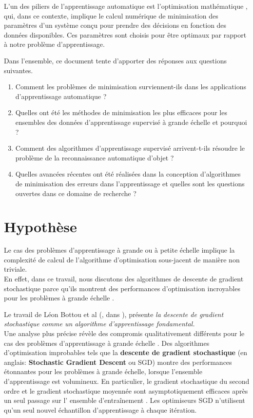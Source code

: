 		L'un des piliers de l'apprentissage automatique est l'optimisation mathématique \cite{bottou2018optimization}, qui, dans ce contexte, implique le calcul numérique de minimisation des paramètres d'un système conçu pour prendre des décisions en fonction des données disponibles. Ces paramètres sont choisis pour être optimaux par rapport à notre problème d'apprentissage.
		
		Dans l'ensemble, ce document tente d'apporter des réponses aux questions suivantes.
		\begin{enumerate}
			\item Comment les problèmes de minimisation surviennent-ils dans les applications d'apprentissage automatique ?
			\item Quelles ont été les méthodes de minimisation les plus efficaces pour les ensembles des données d'apprentissage supervisé à grande échelle et pourquoi ?
			\item Comment des algorithmes d'apprentissage supervisé arrivent-t-ils résoudre le problème de la reconnaissance automatique d'objet ?
			\item Quelles avancées récentes ont été réalisées dans la conception d'algorithmes de minimisation des erreurs dans l'apprentissage et quelles sont les questions ouvertes dans ce domaine de recherche ?
		\end{enumerate}
	
	\section{Hypothèse}
		Le cas des problèmes d'apprentissage à grande ou à petite échelle implique la complexité de calcul de l'algorithme d'optimisation sous-jacent de manière non triviale.\\
		En effet, dans ce travail, nous discutons des algorithmes de descente de gradient stochastique parce qu’ils montrent des performances d'optimisation incroyables pour les problèmes à grande échelle \cite{bottou2010large}. 
		
		Le travail de Léon Bottou et al (\eg, dans \cite{bottou2010large} \cite{wijnhoven2010fast} \cite{bottou2012stochastic} ), présente \textit{la descente de gradient stochastique comme un algorithme d'apprentissage fondamental.}\\
		Une analyse plus précise révèle des compromis qualitativement différents pour le cas des problèmes d'apprentissage à grande échelle \cite{bottou2018optimization}. Des algorithmes d'optimisation improbables tels que la \textbf{descente de gradient stochastique} (en anglais: \textbf{Stochastic Gradient Descent} ou SGD) montre des performances étonnantes pour les problèmes à grande échelle, lorsque l'ensemble d'apprentissage est volumineux. En particulier, le gradient stochastique du second ordre et le gradient stochastique moyennée sont asymptotiquement efficaces après un seul passage sur l' ensemble d'entraînement \cite{bottou2010large}. Les optimiseurs SGD n'utilisent qu'un seul nouvel échantillon d'apprentissage à chaque itération.
		
